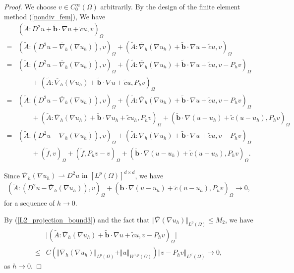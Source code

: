 \documentclass[10pt,a4paper]{amsart}
\begin{document}
\begin{proof}
We choose $v \in C_{0}^{\infty}(\Omega)$ arbitrarily. 
By the design of the finite element method (\ref{nondiv_fem}), We have 
\begin{align*}
& (\tilde{A}:D^{2}u + \tilde{\boldsymbol{b}}\cdot\nabla u 
+ \tilde{c}u, v)_{\Omega} \\
= & (\tilde{A}: (D^{2}u - \overline{\nabla}_{h}(\nabla u_{h})), v)_{\Omega} 
+ (\tilde{A}:\overline{\nabla}_{h}(\nabla u_{h}) 
+ \tilde{\boldsymbol{b}}\cdot\nabla u + \tilde{c}u, v)_{\Omega} \\
= & (\tilde{A}: (D^{2}u - \overline{\nabla}_{h}(\nabla u_{h})), v)_{\Omega} 
+ (\tilde{A}:\overline{\nabla}_{h}(\nabla u_{h}) 
+ \tilde{\boldsymbol{b}}\cdot\nabla u + \tilde{c}u, v - P_{h}v)_{\Omega} \\
& \qquad + (\tilde{A}:\overline{\nabla}_{h}(\nabla u_{h}) 
+ \tilde{\boldsymbol{b}}\cdot\nabla u + \tilde{c}u, P_{h}v)_{\Omega} \\
= & (\tilde{A}: (D^{2}u - \overline{\nabla}_{h}(\nabla u_{h})), v)_{\Omega} 
+ (\tilde{A}:\overline{\nabla}_{h}(\nabla u_{h}) 
+ \tilde{\boldsymbol{b}}\cdot\nabla u + \tilde{c}u, v - P_{h}v)_{\Omega} \\
& \qquad + (\tilde{A}:\overline{\nabla}_{h}(\nabla u_{h}) 
+ \tilde{\boldsymbol{b}}\cdot\nabla u_{h} + \tilde{c}u_{h}, P_{h}v)_{\Omega} 
+ (\tilde{\boldsymbol{b}}\cdot \nabla(u - u_{h}) 
+ \tilde{c}(u - u_{h}), P_{h}v)_{\Omega} \\
= & (\tilde{A}: (D^{2}u - \overline{\nabla}_{h}(\nabla u_{h})), v)_{\Omega} 
+ (\tilde{A}:\overline{\nabla}_{h}(\nabla u_{h}) 
+ \tilde{\boldsymbol{b}}\cdot\nabla u + \tilde{c}u, v - P_{h}v)_{\Omega} \\
& \qquad + (\tilde{f}, v)_{\Omega} + (\tilde{f}, P_{h}v - v)_{\Omega} 
+ (\tilde{\boldsymbol{b}}\cdot \nabla(u - u_{h}) 
+ \tilde{c}(u - u_{h}), P_{h}v)_{\Omega}.
\end{align*}

Since $\overline{\nabla}_{h}(\nabla u_{h}) \rightharpoonup D^{2}u 
\text{ in } [L^{p}(\Omega)]^{d \times d}$, we have 
\begin{align*}
(\tilde{A}:(D^{2}u - \overline{\nabla}_{h}(\nabla u_{h})), v)_{\Omega} 
+ (\tilde{\boldsymbol{b}}\cdot \nabla(u - u_{h}) 
+ \tilde{c}(u - u_{h}), P_{h}v)_{\Omega}\rightarrow 0,
\end{align*}
for a sequence of $h \rightarrow 0$.

By (\ref{L2_projection_bound3}) and the fact that $\Vert \overline{\nabla}(\nabla u_{h})\Vert_{L^{p}(\Omega)} 
\leq M_{2}$, we have 
\begin{align*}
& \vert (\tilde{A}:\overline{\nabla}_{h}(\nabla u_{h})
+ \tilde{\boldsymbol{b}}\cdot \nabla u + \tilde{c}u, v - P_{h}v)_{\Omega} \vert \\
\leq & C \left(\Vert \overline{\nabla}_{h}(\nabla u_{h})\Vert_{L^{p}(\Omega)} 
+ \Vert u\Vert_{W^{1,p}(\Omega)}\right)\Vert v - P_{h} 
v\Vert_{L^{p^{\prime}}(\Omega)} \rightarrow 0,
\end{align*}
as $h \rightarrow 0$. 


\end{proof}
\end{document}
